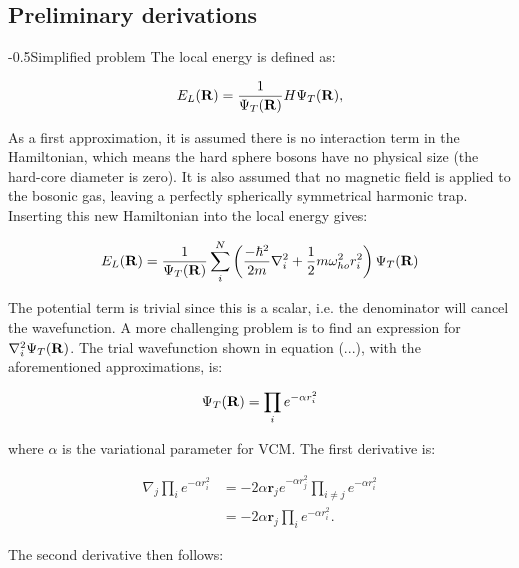 \documentclass[english, a4paper]{article}
\makeatletter
\renewcommand{\subsubsection}{\@startsection{subsubsection}{3}{0pt}%
{-\baselineskip}{0.5\baselineskip}{\bf\large}}
\newcommand{\bm}[1]{\mathbf{#1}}
\makeatother
\begin{document}
\subsection{Preliminary derivations}

\subsubsection{Simplified problem}
The local energy is defined as:

\begin{equation}
    E_L({\bf R})=\frac{1}{\Psi_T({\bf R})}H\Psi_T({\bf R}),
    \label{eq:locale}
\end{equation}

As a first approximation, it is assumed there is no interaction term in the Hamiltonian, which means the hard sphere bosons have no physical size (the hard-core diameter is zero). It is also assumed that no magnetic field is applied to the bosonic gas, leaving a perfectly spherically symmetrical harmonic trap. Inserting this new Hamiltonian into the local energy gives:

\begin{equation}
  E_L({\bf R})=\frac{1}{\Psi_T({\bf R})}\sum_i^N \left(
  \frac{-\hbar^2}{2m}
  \nabla_{i}^2 +
  \frac{1}{2}m\omega_{ho}^2r_i^2\right)\Psi_T({\bf R})
  \label{eq:localeInsertH}
\end{equation}

The potential term is trivial since this is a scalar, i.e. the denominator will cancel the wavefunction. A more challenging problem is to find an expression for $\nabla^2_i\Psi_T({\bf R})$. The trial wavefunction shown in equation (...), with the aforementioned approximations, is:

\begin{equation}
 \Psi_T({\bf R}) = \prod_i e^{-\alpha r_i^2}	\label{wavefunction_a}
\end{equation}

where $\alpha$ is the variational parameter for VCM. The first derivative is:

\begin{align}
 \nabla_j\prod_i e^{-\alpha r_i^2} 
 &= -2\alpha \bm{r}_j e^{-\alpha r_j^2} \prod_{i \neq j} e^{-\alpha r_i^2}\\
 &= -2\alpha \bm{r}_j  \prod_i e^{-\alpha r_i^2}.
 \label{E_L_first_derivative}
\end{align}

The second derivative then follows:
\end{document}
